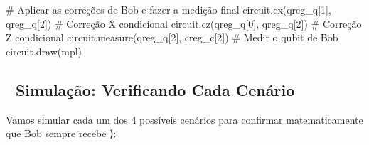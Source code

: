 \documentclass[
  brazilian,
]{report}
\newenvironment{Shaded}{\begin{snugshade}}{\end{snugshade}}
\newcommand{\NormalTok}[1]{\textcolor[rgb]{0.00,0.23,0.31}{#1}}
\begin{document}
\begin{Shaded}
\begin{Highlighting}[]

\NormalTok{\# Aplicar as correções de Bob e fazer a medição final}
\NormalTok{circuit.cx(qreg\_q[1], qreg\_q[2])  \# Correção X condicional}
\NormalTok{circuit.cz(qreg\_q[0], qreg\_q[2])  \# Correção Z condicional}
\NormalTok{circuit.measure(qreg\_q[2], creg\_c[2])  \# Medir o qubit de Bob}
\NormalTok{circuit.draw(\textquotesingle{}mpl\textquotesingle{})}
\end{Highlighting}
\end{Shaded}

\subsection{🔬 Simulação: Verificando Cada
Cenário}\label{simulauxe7uxe3o-verificando-cada-cenuxe1rio}

Vamos simular cada um dos 4 possíveis cenários para confirmar
matematicamente que Bob sempre recebe ⟩:
\end{document}

